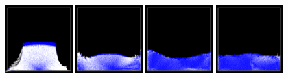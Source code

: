 \documentclass[12pt, A4]{article}
\begin{document}
\begin{figure}[h!]
  \centering
\includegraphics[width=0.23\textwidth]{semilag-state-c/img11}
\includegraphics[width=0.23\textwidth]{semilag-state-c/img2}
\includegraphics[width=0.23\textwidth]{semilag-state-c/img3}
\includegraphics[width=0.23\textwidth]{semilag-state-c/img4}


\end{figure}
\end{document}
